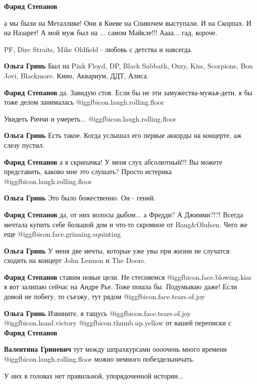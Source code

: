 \begin{itemize}
\begin{itemize}
\textbf{Фарид Степанов} 

а мы были на Металлике! Они в Киеве на Спивочем выступали. И на Скорпах. И на
Назарет! А мой муж был на ... самом Майкле!!! Аааа... гад, короче.

PF, Dire Straits, Mike Oldfield - любовь с детства и навсегда.


\textbf{Ольга Гринь}
Был на Pink Floyd, DP, Black Sabbath, Ozzy, Kiss, Scorpions, Bon Jovi, Blackmore.
Кино, Аквариум, ДДТ, Алиса.

\textbf{Фарид Степанов} да. Завидую стоя. Если бы не эти замужества-мужья-дети, я бы тоже делом занималась @igg{fbicon.laugh.rolling.floor} 

Увидеть Риччи и умереть... @igg{fbicon.laugh.rolling.floor} 

\textbf{Ольга Гринь}
Есть такое.
Когда услышал его первые аккорды на концерте, аж слезу пустил.

\textbf{Фарид Степанов} а я скрипачка! У меня слух абсолютный!!! Вы можете представить, каково мне это слушать? Просто истерика @igg{fbicon.laugh.rolling.floor} 

\textbf{Ольга Гринь}
Это было божественно. Он - гений.

\textbf{Фарид Степанов} да, от них волосы дыбом... а Фредди? А Джимми?!?! Всегда мечтала купить себе большой дом и что-то скромное от Bang\&Olufsen. Чего же еще @igg{fbicon.face.grinning.squinting} 

\textbf{Ольга Гринь}
У меня две мечты, которые уже увы при жизни не случатся: сходить на концерт John Lennon и The Doors.

\textbf{Фарид Степанов} ставим новые цели. Не стесняемся @igg{fbicon.face.blowing.kiss}  я вот залипаю сейчас на Андре Рье. Тоже пошла бы. Подумываю даже! Если домой не побегу, то съезжу, тут рядом @igg{fbicon.face.tears.of.joy} 

\textbf{Ольга Гринь} Извините, я тащусь @igg{fbicon.face.tears.of.joy} @igg{fbicon.hand.victory}  @igg{fbicon.thumb.up.yellow}  от вашей переписки с \textbf{Фарид Степанов}

\textbf{Валентина Гриневич} тут между шпрахкурсами оооочень много времени @igg{fbicon.laugh.rolling.floor}  можно немного побездельничать.

У них в головах нет правильной, упорядоченной истории...


\end{itemize}
\end{itemize}
